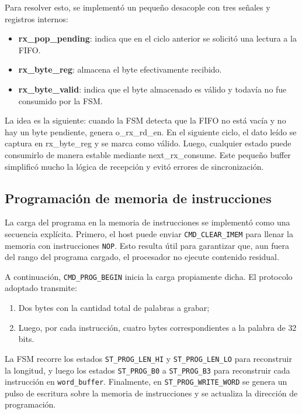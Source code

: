 Para resolver esto, se implementó un pequeño desacople con tres señales y registros internos:

\begin{itemize}
    \item \textbf{rx\_pop\_pending}: indica que en el ciclo anterior se solicitó una lectura a la FIFO.
    \item \textbf{rx\_byte\_reg}: almacena el byte efectivamente recibido.
    \item \textbf{rx\_byte\_valid}: indica que el byte almacenado es válido y todavía no fue consumido por la FSM.
\end{itemize}

La idea es la siguiente: cuando la FSM detecta que la FIFO no está vacía y no hay un byte pendiente, genera o\_rx\_rd\_en. En el siguiente ciclo, el dato leído se captura en rx\_byte\_reg y se marca como válido. Luego, cualquier estado puede consumirlo de manera estable mediante next\_rx\_consume. Este pequeño buffer simplificó mucho la lógica de recepción y evitó errores de sincronización.

\subsection{Programación de memoria de instrucciones}

La carga del programa en la memoria de instrucciones se implementó como una secuencia explícita. Primero, el host puede enviar \texttt{CMD\_CLEAR\_IMEM} para llenar la memoria con instrucciones \texttt{NOP}. Esto resulta útil para garantizar que, aun fuera del rango del programa cargado, el procesador no ejecute contenido residual.

A continuación, \texttt{CMD\_PROG\_BEGIN} inicia la carga propiamente dicha. El protocolo adoptado transmite:

\begin{enumerate}
    \item Dos bytes con la cantidad total de palabras a grabar;
    \item Luego, por cada instrucción, cuatro bytes correspondientes a la palabra de 32 bits.
\end{enumerate}

La FSM recorre los estados \texttt{ST\_PROG\_LEN\_HI} y \texttt{ST\_PROG\_LEN\_LO} para reconstruir la longitud, y luego los estados \texttt{ST\_PROG\_B0} a \texttt{ST\_PROG\_B3} para reconstruir cada instrucción en \texttt{word\_buffer}. Finalmente, en \texttt{ST\_PROG\_WRITE\_WORD} se genera un pulso de escritura sobre la memoria de instrucciones y se actualiza la dirección de programación.

